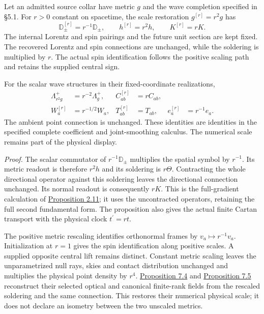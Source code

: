 \documentclass[
  english,
  11pt,
  reqno]{amsart}
\begin{document}
Let an admitted source collar have metric \(g\) and the wave completion
specified in §5.1. For \(r>0\) constant on spacetime, the scale
restoration \(g^{[r]}=r^2g\) has%
 \[
\mathbb D_\pm^{[r]}=r^{-1}\mathbb D_\pm,\qquad
h^{[r]}=r^2h,\qquad K^{[r]}=rK.
\] The internal Lorentz and spin pairings and the future unit section
are kept fixed. The recovered Lorentz and spin connections are
unchanged, while the soldering is multiplied by \(r\). The actual spin
identification follows the positive scaling path and retains the
supplied central sign.

For the scalar wave structures in their fixed-coordinate realizations,%
 \[
\begin{aligned}
\Lambda_{r^2g}^+&=r^{-2}\Lambda_g^+,
&
C_{ab}^{[r]}&=rC_{ab},\\
W_a^{[r]}&=r^{-1/2}W_a,
&
T_{ab}^{[r]}&=T_{ab},
&
e_a^{[r]}&=r^{-1}e_a.
\end{aligned}
\] The ambient point connection is unchanged. These identities are
identities in the specified complete coefficient and joint-smoothing
calculus. The numerical scale remains part of the physical display.

\emph{Proof.} The scalar commutator of \(r^{-1}\mathbb D_\pm\)
multiplies the spatial symbol by \(r^{-1}\). Its metric readout is
therefore \(r^2h\) and its soldering is \(r\Theta\). Contracting the
whole directional operator against this soldering leaves the directional
connection unchanged. Its normal readout is consequently \(rK\). This is
the full-gradient calculation of
\hyperref[prop:online-cartan-physical-scale]{Proposition 2.11}; it uses
the uncontracted operators, retaining the full second fundamental form.
The proposition also gives the actual finite Cartan transport with the
physical clock \(t^{\prime}=rt\).

The positive metric rescaling identifies orthonormal frames by
\(v_a\mapsto r^{-1}v_a\). Initialization at \(r=1\) gives the spin
identification along positive scales. A supplied opposite central lift
remains distinct. Constant metric scaling leaves the unparametrized null
rays, skies and contact distribution unchanged and multiplies the
physical point density by \(r^4\).
\hyperref[prop:online-canonical-optical-completion]{Proposition 7.4} and
\hyperref[prop:online-canonical-finite-rank-models]{Proposition 7.5}
reconstruct their selected optical and canonical finite-rank fields from
the rescaled soldering and the same connection. This restores their
numerical physical scale; it does not declare an isometry between the
two unscaled metrics.
\end{document}
